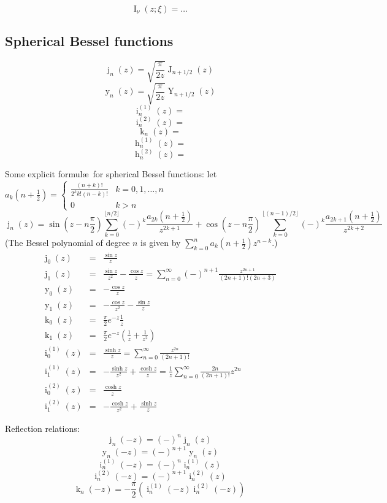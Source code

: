 \documentclass[10pt,dvipdfmx,letterpaper,twoside]{article}
\let\O=\operatorname
\begin{document}
\[ \O{I}_\nu(z; \xi) = \dots \]

\subsection{Spherical Bessel functions}

\[ \O{j}_n(z) = \sqrt{\frac{\pi}{2z}} \O{J}_{n+1/2}(z) \]
\[ \O{y}_n(z) = \sqrt{\frac{\pi}{2z}} \O{Y}_{n+1/2}(z) \]
\[ \O{i}^{(1)}_n(z) = \]
\[ \O{i}^{(2)}_n(z) = \]
\[ \O{k}_n(z) = \]
\[ \O{h}^{(1)}_n(z) = \]
\[ \O{h}^{(2)}_n(z) = \]

Some explicit formul\ae\ for spherical Bessel functions:
let $a_k(n+\tfrac12) = \begin{cases}\frac{(n+k)!}{2^k k! (n-k)!} & k=0,1,\dots,n\\0&k>n\end{cases}$
\[ \O{j}_n(z) = \sin(z - n\frac\pi2)\sum_{k=0}^{\lfloor n/2\rfloor}(-)^k\frac{a_{2k}(n+\tfrac12)}{z^{2k+1}}
    + \cos(z - n\frac\pi2)\sum_{k=0}^{\lfloor (n-1)/2\rfloor}(-)^k\frac{a_{2k+1}(n+\tfrac12)}{z^{2k+2}} \]
(The Bessel polynomial of degree $n$ is given by $\sum_{k=0}^n a_k(n+\tfrac12)z^{n-k}$.)
\begin{eqnarray*}
\O{j}_0(z) &=& \frac{\sin z}{z} \\
\O{j}_1(z) &=& \frac{\sin z}{z^2} - \frac{\cos z}{z} = \sum_{n=0}^\infty (-)^{n+1}\frac{z^{2n+1}}{(2n+1)!(2n+3)} \\
\O{y}_0(z) &=& -\frac{\cos z}{z} \\
\O{y}_1(z) &=& -\frac{\cos z}{z^2} - \frac{\sin z}{z} \\
\O{k}_0(z) &=& \frac{\pi}{2} e^{-z} \frac{1}{z} \\
\O{k}_1(z) &=& \frac{\pi}{2} e^{-z} \left( \frac{1}{z} + \frac{1}{z^2} \right) \\
\O{i}^{(1)}_0(z) &=& \frac{\sinh z}{z} = \sum_{n=0}^\infty\frac{z^{2n}}{(2n+1)!} \\
\O{i}^{(1)}_1(z) &=& -\frac{\sinh z}{z^2} + \frac{\cosh z}{z} = \frac{1}{z}\sum_{n=0}^\infty\frac{2n}{(2n+1)!}z^{2n} \\
\O{i}^{(2)}_0(z) &=& \frac{\cosh z}{z} \\
\O{i}^{(2)}_1(z) &=& -\frac{\cosh z}{z^2} + \frac{\sinh z}{z}
\end{eqnarray*}

Reflection relations:
\[ \O{j}_n(-z) = (-)^n\O{j}_n(z) \]
\[ \O{y}_n(-z) = (-)^{n+1}\O{y}_n(z) \]
\[ \O{i}^{(1)}_n(-z) = (-)^n\O{i}^{(1)}_n(z) \]
\[ \O{i}^{(2)}_n(-z) = (-)^{n+1}\O{i}^{(2)}_n(z) \]
\[ \O{k}_n(-z) = -\frac{\pi}{2}\left( \O{i}^{(1)}_n(-z) \O{i}^{(2)}_n(-z) \right) \]
\end{document}
